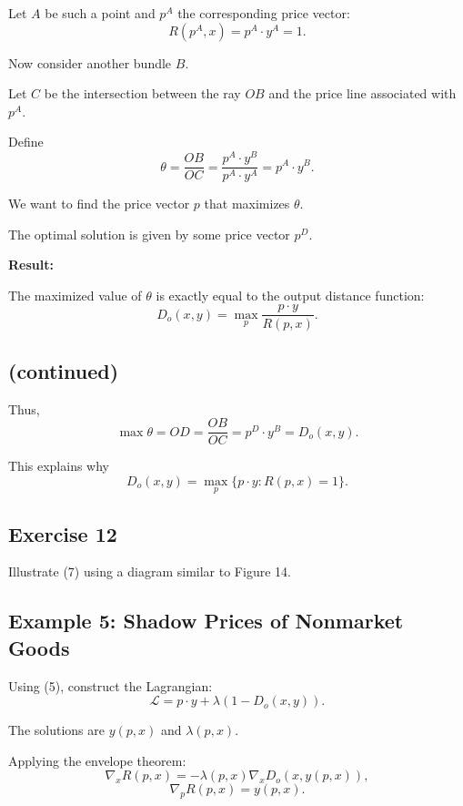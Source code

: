 Let $A$ be such a point and $p^A$ the corresponding price vector:
\[
R(p^A,x)=p^A \cdot y^A = 1.
\]

Now consider another bundle $B$.

Let $C$ be the intersection between the ray $OB$ and the price line
associated with $p^A$.

Define
\[
\theta
=
\frac{OB}{OC}
=
\frac{p^A \cdot y^B}{p^A \cdot y^A}
=
p^A \cdot y^B.
\]

We want to find the price vector $p$ that maximizes $\theta$.

The optimal solution is given by some price vector $p^D$.

\medskip

\textbf{Result:}

The maximized value of $\theta$ is exactly equal to the output distance function:
\[
D_o(x,y)=\max_p \frac{p\cdot y}{R(p,x)}.
\]



\subsection*{(continued)}

Thus,
\[
\max \theta = OD = \frac{OB}{OC} = p^D \cdot y^B = D_o(x,y).
\]

This explains why
\[
D_o(x,y)=\max_p \{p\cdot y : R(p,x)=1\}.
\]

\begin{tcolorbox}

\subsection*{Exercise 12}

Illustrate (7) using a diagram similar to Figure 14.

\end{tcolorbox}

\subsection*{Example 5: Shadow Prices of Nonmarket Goods}

Using (5), construct the Lagrangian:
\[
\mathcal{L}=p\cdot y + \lambda(1 - D_o(x,y)).
\]

The solutions are $y(p,x)$ and $\lambda(p,x)$.

Applying the envelope theorem:
\[
\nabla_x R(p,x)
=
-\lambda(p,x)\nabla_x D_o(x,y(p,x)),
\]
\[
\nabla_p R(p,x)=y(p,x).
\]


